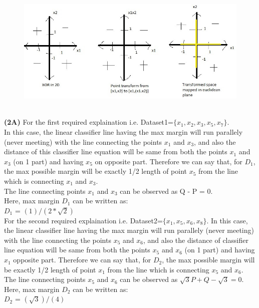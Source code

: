 \documentclass[11pt]{article}
\renewcommand\part[1]{\vspace{.10in}\textbf{(#1)}}
\begin{document}
\begin{figure}[h]
   \centering
  \includegraphics[width=12cm, height=6cm]{ML.jpg}
\end{figure}


\part{2A} For the first required explaination i.e. Dataset1=$\{x_1,x_2,x_3,x_5,x_7\}$.\\
In this case, the linear classifier line having the max margin will run parallely (never meeting) with the line connecting the points $x_1$ and $x_3$, and also the distance of this classifier line equation will be same from both the points $x_1$ and $x_3$ (on 1 part) and having $x_5$ on opposite part. Therefore we can say that, for $D_1$, the max possible margin will be exactly 1/2 length of point $x_5$ from the line which is connecting $x_1$ and $x_3$.\\ The line connecting points $x_1$ and $x_3$ can be observed as Q - P = 0.\\
Here, max margin $D_1$ can be written as:\\
$D_{1}$ = $(1)/(2*\sqrt {2})$\\ 

For the second required explaination i.e. Dataset2=$\{x_1,x_5,x_6,x_8\}$. In this case, the linear classifier line having the max margin will run parallely (never meeting) with the line connecting the points $x_5$ and $x_6$, and also the distance of classifier line equation will be same from both the points $x_5$ and $x_6$ (on 1 part) and having $x_1$ opposite part. Therefore we can say that, for $D_2$, the max possible margin will be exactly 1/2 length of point $x_1$ from the line which is connecting $x_5$ and $x_6$.\\
The line connecting points $x_5$ and $x_6$ can be observed as $\sqrt {3}P + Q - \sqrt {3} = 0$.\\ 
Here, max margin $D_2$ can be written as:\\
$D_{2}$ = $(\sqrt {3})/(4)$ \\ 
\end{document}
